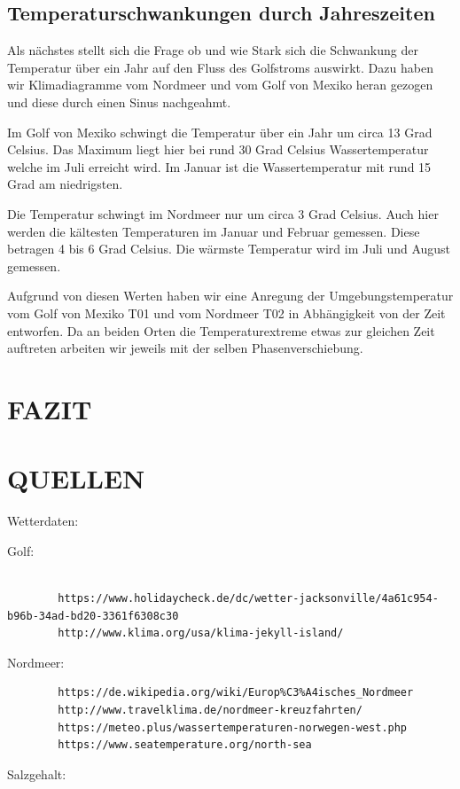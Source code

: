 \documentclass[a4paper,twoside]{article}
\begin{document}
	\subsection{Temperaturschwankungen durch Jahreszeiten}
	
	Als nächstes stellt sich die Frage ob und wie Stark sich die Schwankung der Temperatur über ein Jahr auf den Fluss des Golfstroms auswirkt. Dazu haben wir Klimadiagramme vom Nordmeer und vom Golf von Mexiko heran gezogen und diese durch einen Sinus nachgeahmt. 
	
	Im Golf von Mexiko schwingt die Temperatur über ein Jahr um circa 13 Grad Celsius. Das Maximum liegt hier bei rund 30 Grad Celsius Wassertemperatur welche im Juli erreicht wird. Im Januar ist die Wassertemperatur mit rund 15 Grad am niedrigsten.
	
	Die Temperatur schwingt im Nordmeer nur um circa 3 Grad Celsius. Auch hier werden die kältesten Temperaturen im Januar und Februar gemessen. Diese betragen 4 bis 6 Grad Celsius. Die wärmste Temperatur wird im Juli und August gemessen. 
	
	Aufgrund von diesen Werten haben wir eine Anregung der Umgebungstemperatur vom Golf von Mexiko T01 und vom Nordmeer T02 in Abhängigkeit von der Zeit entworfen. Da an beiden Orten die Temperaturextreme etwas zur gleichen Zeit auftreten arbeiten wir jeweils mit der selben Phasenverschiebung. 
	


	\section{\uppercase{Fazit}}\label{sec:Fazit}
	
	
 	\section{\uppercase{Quellen}}\label{sec: Quellen}
	Wetterdaten: 
	
	\noindent Golf:
	\begin{verbatim}
		
		https://www.holidaycheck.de/dc/wetter-jacksonville/4a61c954-b96b-34ad-bd20-3361f6308c30  
		http://www.klima.org/usa/klima-jekyll-island/
	\end{verbatim}
	Nordmeer:
	\begin{verbatim}
		https://de.wikipedia.org/wiki/Europ%C3%A4isches_Nordmeer
		http://www.travelklima.de/nordmeer-kreuzfahrten/
		https://meteo.plus/wassertemperaturen-norwegen-west.php
		https://www.seatemperature.org/north-sea
	\end{verbatim}
	Salzgehalt:
	
\end{document}
